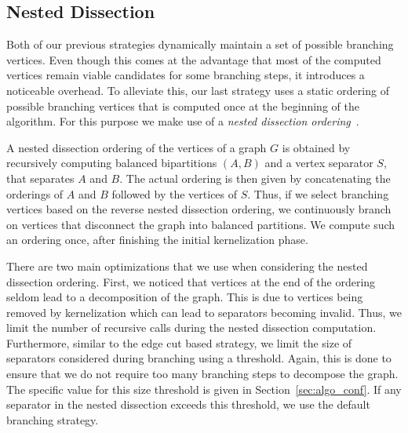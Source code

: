 \documentclass[a4paper,UKenglish,cleveref, autoref, thm-restate]{lipics-v2021}
\begin{document}
\subsection{Nested Dissection}
Both of our previous strategies dynamically maintain a set of possible branching vertices.
Even though this comes at the advantage that most of the computed vertices remain viable candidates for some branching steps, it introduces a noticeable overhead.
To alleviate this, our last strategy uses a static ordering of possible branching vertices that is computed once at the beginning of the algorithm.
For this purpose we make use of a \emph{nested dissection ordering}~\cite{george1973nested}.

A nested dissection ordering of the vertices of a graph $G$ is obtained by recursively computing balanced bipartitions $(A,B)$ and a vertex separator $S$, that separates $A$ and $B$.
The actual ordering is then given by concatenating the orderings of $A$ and $B$ followed by the vertices of $S$.
Thus, if we select branching vertices based on the reverse nested dissection
ordering, we continuously branch on vertices that disconnect the graph into balanced partitions. 
We compute such an ordering once, after finishing the initial kernelization phase.

There are two main optimizations that we use when considering the nested dissection ordering.
First, we noticed that vertices at the end of the ordering seldom lead to a decomposition of the graph. 
This is due to vertices being removed by kernelization which can lead to separators becoming invalid.
Thus, we limit the number of recursive calls during the nested dissection computation.
Furthermore, similar to the edge cut based strategy, we limit the size of
separators considered during branching using a threshold.
Again, this is done to ensure that we do not require too many branching steps to decompose the graph.
The specific value for this size threshold is given in Section~\ref{sec:algo_conf}.
If any separator in the nested dissection exceeds this threshold, we use the default branching strategy.
\end{document}

